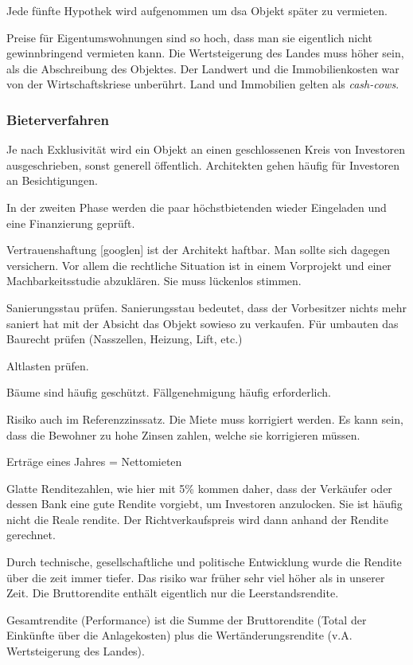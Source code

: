 \documentclass[11pt]{article}
\begin{document}
Jede fünfte Hypothek wird aufgenommen um dsa Objekt später zu vermieten.

Preise für Eigentumswohnungen sind so hoch, dass man sie eigentlich nicht
gewinnbringend vermieten kann. Die Wertsteigerung des Landes muss höher
sein, als die Abschreibung des Objektes. Der Landwert und die
Immobilienkosten war von der Wirtschaftskriese unberührt. Land und
Immobilien gelten als \emph{cash-cows}.

\subsubsection{Bieterverfahren}
\label{sec-2-3-2}

Je nach Exklusivität wird ein Objekt an einen geschlossenen Kreis von
Investoren ausgeschrieben, sonst generell öffentlich. Architekten gehen
häufig für Investoren an Besichtigungen.

In der zweiten Phase werden die paar höchstbietenden wieder Eingeladen und
eine Finanzierung geprüft.

Vertrauenshaftung [googlen] ist der Architekt haftbar. Man sollte sich
dagegen versichern. Vor allem die rechtliche Situation ist in einem
Vorprojekt und einer Machbarkeitsstudie abzuklären. Sie muss lückenlos
stimmen.

Sanierungsstau prüfen. Sanierungsstau bedeutet, dass der Vorbesitzer nichts
mehr saniert hat mit der Absicht das Objekt sowieso zu verkaufen. Für
umbauten das Baurecht prüfen (Nasszellen, Heizung, Lift, etc.)

Altlasten prüfen.

Bäume sind häufig geschützt. Fällgenehmigung häufig erforderlich.

Risiko auch im Referenzzinssatz. Die Miete muss korrigiert werden. Es kann
sein, dass die Bewohner zu hohe Zinsen zahlen, welche sie korrigieren
müssen.

Erträge eines Jahres = Nettomieten

Glatte Renditezahlen, wie hier mit 5\% kommen daher, dass der Verkäufer oder
dessen Bank eine gute Rendite vorgiebt, um Investoren anzulocken. Sie ist
häufig nicht die Reale rendite. Der Richtverkaufspreis wird dann anhand der
Rendite gerechnet.

Durch technische, gesellschaftliche und politische Entwicklung wurde die
Rendite über die zeit immer tiefer. Das risiko war früher sehr viel höher
als in unserer Zeit. Die Bruttorendite enthält eigentlich nur die
Leerstandsrendite.

Gesamtrendite (Performance) ist die Summe der Bruttorendite (Total der
Einkünfte über die Anlagekosten) plus die Wertänderungsrendite
(v.A. Wertsteigerung des Landes).
\end{document}
